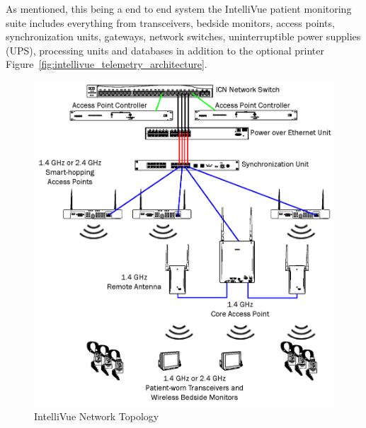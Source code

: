 As mentioned, this being a end to end system the IntelliVue patient monitoring suite includes everything from transceivers, bedside monitors, access points, synchronization units, gateways, network switches, uninterruptible power supplies (UPS), processing units and databases in addition to the optional printer Figure~\ref{fig:intellivue_telemetry_architecture}.

\begin{figure}[H]
  \centering
  \includegraphics[scale=.6]{img/figures/philipsintellivue2.png}
  \caption{IntelliVue Network Topology~\cite{IntelliVue:telemetry}}
  \label{fig:intellivue_telemetry_architecture2}
\end{figure}

